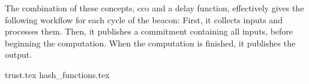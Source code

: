 The combination of these concepts, \gls{cco} and a delay function, effectively gives the following workflow for each cycle of the beacon: First, it collects inputs and processes them. Then, it publishes a commitment containing all inputs, before beginning the computation. When the computation is finished, it publishes the output.

{trust.tex}
{hash_functions.tex}
